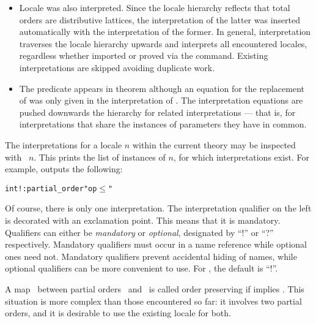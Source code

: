 \begin{isabellebody}
\begin{isamarkuptext}
\begin{itemize}
\item
  Locale  was also interpreted.  Since the
  locale hierarchy reflects that total orders are distributive
  lattices, the interpretation of the latter was inserted
  automatically with the interpretation of the former.  In general,
  interpretation traverses the locale hierarchy upwards and interprets
  all encountered locales, regardless whether imported or proved via
  the  command.  Existing interpretations are
  skipped avoiding duplicate work.
\item
  The predicate  appears in theorem 
  although an equation for the replacement of  was only
  given in the interpretation of .  The
  interpretation equations are pushed downwards the hierarchy for
  related interpretations --- that is, for interpretations that share
  the instances of parameters they have in common.
\end{itemize}%
\end{isamarkuptext}%
\isamarkuptrue%
%
\begin{isamarkuptext}%
The interpretations for a locale $n$ within the current
  theory may be inspected with ~$n$.  This
  prints the list of instances of $n$, for which interpretations exist.
  For example,  
  outputs the following:
\begin{small}
\begin{alltt}
  int! : partial_order "op \(\le\)"
\end{alltt}
\end{small}
  Of course, there is only one interpretation.
  The interpretation qualifier on the left is decorated with an
  exclamation point.  This means that it is mandatory.  Qualifiers
  can either be \emph{mandatory} or \emph{optional}, designated by
  ``!'' or ``?'' respectively.  Mandatory qualifiers must occur in a
  name reference while optional ones need not.  Mandatory qualifiers
  prevent accidental hiding of names, while optional qualifiers can be
  more convenient to use.  For , the
  default is ``!''.%
\end{isamarkuptext}%
\isamarkuptrue%
%
\isamarkuptrue%
%
\begin{isamarkuptext}%
A map~\isa{{\isasymphi}} between partial orders~\isa{{\isasymsqsubseteq}} and~\isa{{\isasympreceq}}
  is called order preserving if  implies .  This situation is more complex than those encountered so
  far: it involves two partial orders, and it is desirable to use the
  existing locale for both.


\end{isamarkuptext}
\end{isabellebody}

